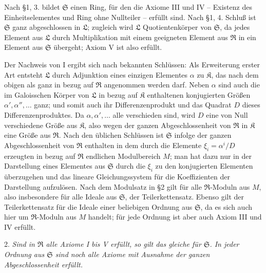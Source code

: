 \documentclass[11pt]{article}
\providecommand{\mR}{\mathfrak{R}}
\providecommand{\mK}{\mathfrak{K}}
\providecommand{\mL}{\mathfrak{L}}
\providecommand{\mS}{\mathfrak{S}}
\begin{document}
Nach §1, 3. bildet $\mS$ einen Ring, für den die Axiome III und IV -- Existenz des Einheitselementes und Ring ohne Nullteiler -- erfüllt sind. Nach §1, 4. Schluß ist $\mS$ ganz abgeschlossen in $\mL$; zugleich wird $\mL$ Quotientenkörper von $\mS$, da jedes Element aus $\mL$ durch Multiplikation mit einem geeigneten Element aus $\mR$ in ein Element aus $\mS$ übergeht; Axiom V ist also erfüllt.

Der Nachweis von I ergibt sich nach bekannten Schlüssen: Als Erweiterung erster Art entsteht $\mL$ durch Adjunktion eines einzigen Elementes $\alpha$ zu $\mK$, das nach dem obigen als ganz in bezug auf $\mR$ angenommen werden darf. Neben $\alpha$ sind auch die im Galoisschen Körper von $\mL$ in bezug auf $\mK$ enthaltenen konjugierten Größen $\alpha',\alpha'',\ldots$ ganz; und somit auch ihr Differenzenprodukt und das Quadrat $D$ dieses Differenzenproduktes. Da $\alpha,\alpha',\ldots$ alle verschieden sind, wird $D$ eine von Null verschiedene Größe aus $\mK$, also wegen der ganzen Abgeschlossenheit von $\mR$ in $\mK$ eine Größe aus $\mR$. Nach den üblichen Schlüssen ist $\mS$ infolge der ganzen Abgeschlossenheit von $\mR$ enthalten in dem durch die Elemente $\xi_i=\alpha^i/D$ erzeugten in bezug auf $\mR$ endlichen Modulbereich $M$; man hat dazu nur in der Darstellung eines Elementes aus $\mS$ durch die $\xi_i$ zu den konjugierten Elementen überzugehen und das lineare Gleichungssystem für die Koeffizienten der Darstellung aufzulösen. Nach dem Modulsatz in §2 gilt für alle $\mR$-Moduln aus $M$, also insbesondere für alle Ideale aus $\mS$, der Teilerkettensatz. Ebenso gilt der Teilerkettensatz für die Ideale einer beliebigen Ordnung aus $\mS$, da es sich auch hier um $\mR$-Moduln aus $M$ handelt; für jede Ordnung ist aber auch Axiom III und IV erfüllt.

2. \emph{Sind in $\mR$ alle Axiome I bis V erfüllt, so gilt das gleiche für $\mS$. In jeder Ordnung aus $\mS$ sind noch alle Axiome mit Ausnahme der ganzen Abgeschlossenheit erfüllt.}
\end{document}

